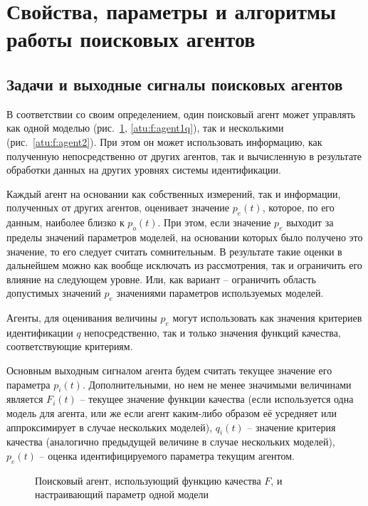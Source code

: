 

\section{Свойства, параметры и алгоритмы работы поисковых агентов}  %

\subsection{Задачи и выходные сигналы поисковых агентов} %

В соответствии со своим определением,
один поисковый агент может управлять как одной моделью (рис.~\ref{atu:f:agent1}, \ref{atu:f:agent1q}),
так и несколькими (рис.~\ref{atu:f:agent2}).
При этом он может использовать информацию,
как полученную непосредственно от других агентов,
так и вычисленную в результате обработки данных на других уровнях системы идентификации.

Каждый агент на основании как собственных измерений, так и информации,
полученных от других агентов, оценивает значение $p_e(t)$,
которое, по его данным, наиболее близко к $p_o(t)$.
При этом, если значение $p_e$ выходит за пределы
значений параметров моделей, на основании которых
было получено это значение, то его следует считать сомнительным.
В результате такие оценки в дальнейшем можно
как вообще исключать из рассмотрения, так и ограничить
его влияние на следующем уровне.
Или, как вариант -- ограничить область допустимых
значений $p_e$ значениями параметров используемых моделей.

Агенты, для оценивания величины $p_e$
могут использовать как значения критериев идентификации $q$
непосредственно, так и только значения функций качества,
соответствующие критериям.

Основным выходным сигналом агента будем считать текущее
значение его параметра $p_i(t)$. Дополнительными,
но нем не менее значимыми величинами является
$F_i(t)$ -- текущее значение функции качества
(если используется одна  модель для агента, или же если агент каким-либо образом её усредняет
или аппроксимирует в случае нескольких моделей),
$q_i(t)$ -- значение критерия качества (аналогично предыдущей величине в случае нескольких моделей),
$p_e(t)$ -- оценка идентифицируемого параметра текущим агентом.


\begin{figure}[htb!]
\begin{center}

\end{center}
\caption{Поисковый агент, использующий функцию качества $F$, и настраивающий параметр одной модели}
\label{atu:f:agent1}
\end{figure}


